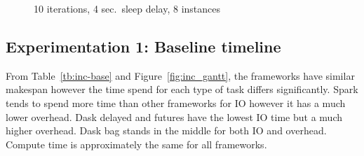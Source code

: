 \documentclass[conference]{IEEEtran}
\begin{document}
\begin{figure}[!t]
    \centering
    
    \caption{10 iterations, 4 sec.\ sleep delay, 8 instances}\label{fig:inc_chunk}
\end{figure}

\subsection{Experimentation 1: Baseline timeline}
From Table~\ref{tb:inc-base} and Figure~\ref{fig:inc_gantt}, the frameworks have
similar makespan however the time spend for each type of task differs significantly.
Spark tends to spend more time than other frameworks for IO however it has a much
lower overhead. Dask delayed and futures have the lowest IO time but a much higher
overhead. Dask bag stands in the middle for both IO and overhead. Compute time is
approximately the same for all frameworks.
\end{document}
